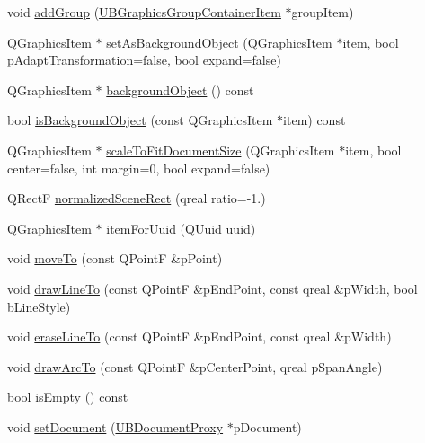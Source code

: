 \begin{DoxyCompactItemize}
void \hyperlink{class_u_b_graphics_scene_a4e26483b01f706f83cbbffaac618dbc6}{add\-Group} (\hyperlink{class_u_b_graphics_group_container_item}{U\-B\-Graphics\-Group\-Container\-Item} $\ast$group\-Item)
\item 
Q\-Graphics\-Item $\ast$ \hyperlink{class_u_b_graphics_scene_af73c8ccfbf79c5b00b5195ab3de28328}{set\-As\-Background\-Object} (Q\-Graphics\-Item $\ast$item, bool p\-Adapt\-Transformation=false, bool expand=false)
\item 
Q\-Graphics\-Item $\ast$ \hyperlink{class_u_b_graphics_scene_a49ec61d268a5757bb2d1f2ed7f4b8d26}{background\-Object} () const 
\item 
bool \hyperlink{class_u_b_graphics_scene_a918a255067499aa71829c286924a2e53}{is\-Background\-Object} (const Q\-Graphics\-Item $\ast$item) const 
\item 
Q\-Graphics\-Item $\ast$ \hyperlink{class_u_b_graphics_scene_ad5c308fdec8c2a7656b1caa35ece19e4}{scale\-To\-Fit\-Document\-Size} (Q\-Graphics\-Item $\ast$item, bool center=false, int margin=0, bool expand=false)
\item 
Q\-Rect\-F \hyperlink{class_u_b_graphics_scene_a16c659f8d2d2d8c09eff096f6f290b44}{normalized\-Scene\-Rect} (qreal ratio=-\/1.)
\item 
Q\-Graphics\-Item $\ast$ \hyperlink{class_u_b_graphics_scene_a00577d96d8060f76953659cc48ecdff4}{item\-For\-Uuid} (Q\-Uuid \hyperlink{class_u_b_item_a242c8e4390dc3244bd42023b349b042b}{uuid})
\item 
void \hyperlink{class_u_b_graphics_scene_a941121f7dc85d8868d108fe7f3397193}{move\-To} (const Q\-Point\-F \&p\-Point)
\item 
void \hyperlink{class_u_b_graphics_scene_a539db7c6773c2f0f560b1be082e71c8e}{draw\-Line\-To} (const Q\-Point\-F \&p\-End\-Point, const qreal \&p\-Width, bool b\-Line\-Style)
\item 
void \hyperlink{class_u_b_graphics_scene_aa337ae1428c734e7b4bef8a7404c926b}{erase\-Line\-To} (const Q\-Point\-F \&p\-End\-Point, const qreal \&p\-Width)
\item 
void \hyperlink{class_u_b_graphics_scene_a56e8a13badcf6e0c4780557e45752fbe}{draw\-Arc\-To} (const Q\-Point\-F \&p\-Center\-Point, qreal p\-Span\-Angle)
\item 
bool \hyperlink{class_u_b_graphics_scene_aa764f68de12837b568b1c2abd45a92eb}{is\-Empty} () const 
\item 
void \hyperlink{class_u_b_graphics_scene_ab0be6ef8f35c143360e4816cef2ef80a}{set\-Document} (\hyperlink{class_u_b_document_proxy}{U\-B\-Document\-Proxy} $\ast$p\-Document)

\end{DoxyCompactItemize}
